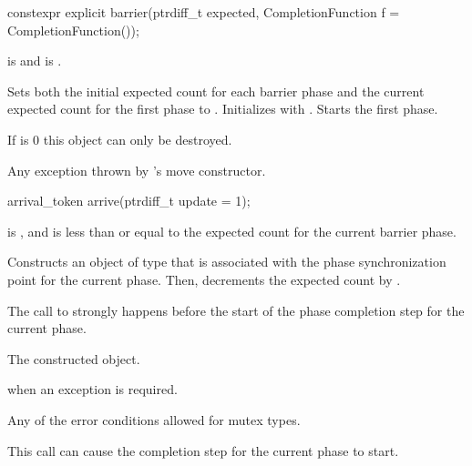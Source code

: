 \begin{itemdecl}
constexpr explicit barrier(ptrdiff_t expected,
                           CompletionFunction f = CompletionFunction());
\end{itemdecl}

\begin{itemdescr}
\pnum
\expects
{} is  and
 is .

\pnum
\effects
Sets both the initial expected count for each barrier phase and
the current expected count for the first phase to .
Initializes  with .
Starts the first phase.
\begin{note}
If  is 0 this object can only be destroyed.
\end{note}

\pnum
\throws
Any exception thrown by 's move constructor.
\end{itemdescr}

%
\begin{itemdecl}
arrival_token arrive(ptrdiff_t update = 1);
\end{itemdecl}

\begin{itemdescr}
\pnum
\expects
{} is , and
 is less than or equal to
the expected count for the current barrier phase.

\pnum
\effects
Constructs an object of type 
that is associated with the phase synchronization point for the current phase.
Then, decrements the expected count by .

\pnum
\sync
The call to  strongly happens before
the start of the phase completion step for the current phase.

\pnum
\returns
The constructed  object.

\pnum
\throws
{} when an exception is required.

\pnum
\errors
Any of the error conditions
allowed for mutex types.

\pnum
\begin{note}
This call can cause the completion step for the current phase to start.
\end{note}
\end{itemdescr}

